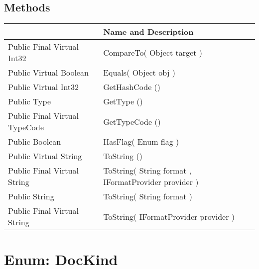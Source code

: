 \documentclass[11pt, oneside, a4paper]{book}
\begin{document}
\subsection{Methods}
\begin{center}
\begin{tabular}{| p{3cm} | p{12cm} | }
\hline
\textbf{ } & \textbf{ Name and Description}\\
\hline
 Public  Final  Virtual  Int32 &  CompareTo(\hypertarget{SoftwareEngineeringTools.{}Documentation.{}DocImageKind.{}CompareTo\_Object}{} Object  target  )\\
\hline
 Public  Virtual  Boolean &  Equals(\hypertarget{SoftwareEngineeringTools.{}Documentation.{}DocImageKind.{}Equals\_Object}{} Object  obj  )\\
\hline
 Public  Virtual  Int32 &  GetHashCode ()\hypertarget{SoftwareEngineeringTools.{}Documentation.{}DocImageKind.{}GetHashCode}{}\\
\hline
 Public  Type &  GetType ()\hypertarget{SoftwareEngineeringTools.{}Documentation.{}DocImageKind.{}GetType}{}\\
\hline
 Public  Final  Virtual  TypeCode &  GetTypeCode ()\hypertarget{SoftwareEngineeringTools.{}Documentation.{}DocImageKind.{}GetTypeCode}{}\\
\hline
 Public  Boolean &  HasFlag(\hypertarget{SoftwareEngineeringTools.{}Documentation.{}DocImageKind.{}HasFlag\_Enum}{} Enum  flag  )\\
\hline
 Public  Virtual  String &  ToString ()\hypertarget{SoftwareEngineeringTools.{}Documentation.{}DocImageKind.{}ToString}{}\\
\hline
 Public  Final  Virtual  String &  ToString(\hypertarget{SoftwareEngineeringTools.{}Documentation.{}DocImageKind.{}ToString\_String\_IFormatProvider}{} String  format  ,  IFormatProvider  provider  )\\
\hline
 Public  String &  ToString(\hypertarget{SoftwareEngineeringTools.{}Documentation.{}DocImageKind.{}ToString\_String}{} String  format  )\\
\hline
 Public  Final  Virtual  String &  ToString(\hypertarget{SoftwareEngineeringTools.{}Documentation.{}DocImageKind.{}ToString\_IFormatProvider}{} IFormatProvider  provider  )\\
\hline
\end{tabular}
\end{center}
 


\hypertarget{SoftwareEngineeringTools.{}Documentation.{}DocKind}{}
\section{Enum: DocKind}
\end{document}
